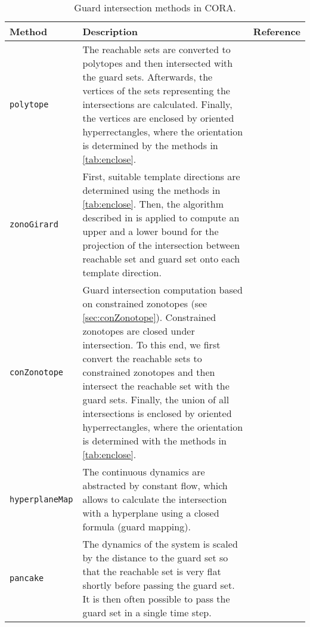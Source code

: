 \begin{table*}
    \centering
    \caption{Guard intersection methods in CORA.}
    \label{tab:guardIntersection}
    \begin{tabular}{l p{10cm} c}
        \toprule
        \textbf{Method}        & \textbf{Description}                                                                                                                                                                                                                                                                                                                                                                                                                                      & \textbf{Reference}     \\
        \midrule
        \texttt{polytope}      & The reachable sets are converted to polytopes and then intersected with the guard sets. Afterwards, the vertices of the sets representing the intersections are calculated. Finally, the vertices are enclosed by oriented hyperrectangles, where the orientation is determined by the methods in \cref{tab:enclose}. & \cite{Althoff2010d} \\
        \texttt{zonoGirard}    & First, suitable template directions are determined using the methods in \cref{tab:enclose}. Then, the algorithm described in \cite{Girard2008} is applied to compute an upper and a lower bound for the projection of the intersection between reachable set and guard set onto each template direction. & \cite{Girard2008} \\
        \texttt{conZonotope}   & Guard intersection computation based on constrained zonotopes (see \cref{sec:conZonotope}). Constrained zonotopes are closed under intersection. To this end, we first convert the reachable sets to constrained zonotopes and then intersect the reachable set with the guard sets. Finally, the union of all intersections is enclosed by oriented hyperrectangles, where the orientation is determined with the methods in \cref{tab:enclose}. & \\
        \texttt{hyperplaneMap} & The continuous dynamics are abstracted by constant flow, which allows to calculate the intersection with a hyperplane using a closed formula (guard mapping). & \cite{Althoff2012a} \\
        \texttt{pancake}       & The dynamics of the system is scaled by the distance to the guard set so that the reachable set is very flat shortly before passing the guard set. It is then often possible to pass the guard set in a single time step. & \cite{Bak2017} \\

\end{tabular}
\end{table*}
